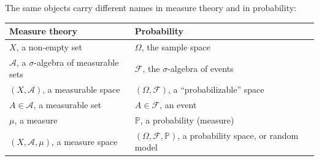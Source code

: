 \begin{remark}\label{rem:ms-dictionary}
The same objects carry different names in measure theory and in probability:
\begin{center}
\begin{tabular}{@{}ll@{}}
\toprule
Measure theory & Probability\\
\midrule
$X$, a non-empty set & $\Omega$, the sample space\\
$\mathcal A$, a $\sigma$-algebra of measurable sets & $\mathcal F$, the $\sigma$-algebra of events\\
$(X,\mathcal A)$, a measurable space & $(\Omega,\mathcal F)$, a ``probabilizable'' space\\
$A\in\mathcal A$, a measurable set & $A\in\mathcal F$, an event\\
$\mu$, a measure & $\mathbb P$, a probability (measure)\\
$(X,\mathcal A,\mu)$, a measure space & $(\Omega,\mathcal F,\mathbb P)$, a probability space, or random model\\
\bottomrule
\end{tabular}
\end{center}
\end{remark}

